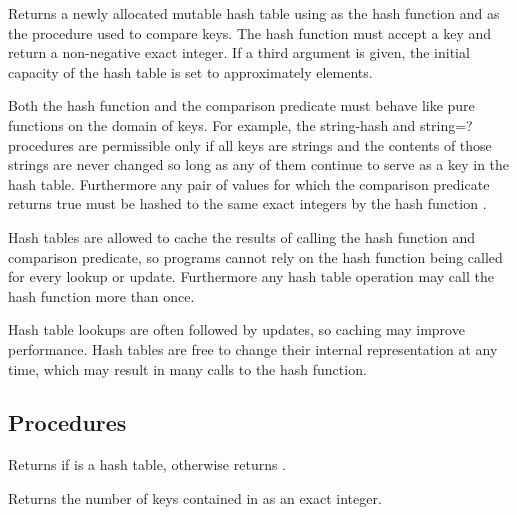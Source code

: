 \begin{entry}{%
}

Returns a newly allocated mutable hash table using  
as the hash function and  as the procedure used to 
compare keys.  The hash function must accept a key and return a 
non-negative exact integer. If a third argument is given, the 
initial capacity of the hash table is set to approximately  elements.

Both the hash function  and the comparison
predicate  must behave like pure functions
on the domain of keys.  For example, the {\cf string-hash}
and {\cf string=?} procedures are permissible only if all
keys are strings and the contents of those strings are never
changed so long as any of them continue to serve as a key in
the hash table.  Furthermore any pair of values for which
the comparison predicate  returns true must
be hashed to the same exact integers by the hash function
.

\begin{note}
Hash tables are allowed to cache the results of calling the
hash function and comparison predicate, so programs cannot
rely on the hash function being called for every lookup or
update.  Furthermore any hash table operation may call the
hash function more than once.
\end{note}

\begin{rationale}
Hash table lookups are often followed by updates, so caching
may improve performance.  Hash tables are free to change
their internal representation at any time, which may result
in many calls to the hash function.
\end{rationale}

\end{entry}

\subsection{Procedures}

\begin{entry}{%
}
Returns \schtrue{} if  is a hash table, otherwise returns \schfalse.
\end{entry}

\begin{entry}{}
Returns the number of keys contained in  as an exact integer.
\end{entry}

